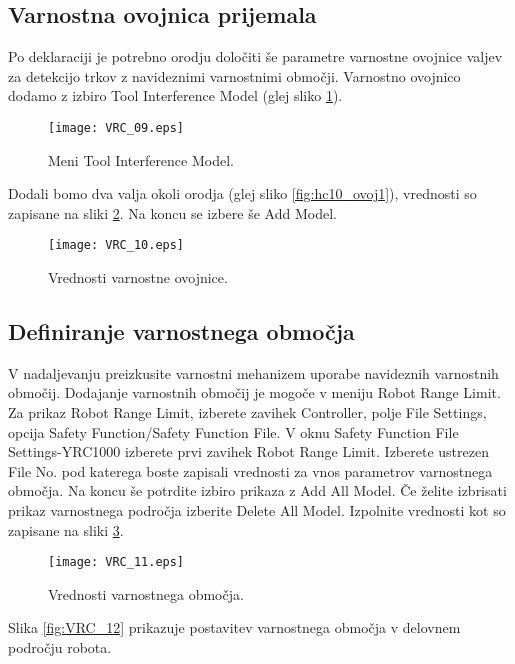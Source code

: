 \subsection*{Varnostna ovojnica prijemala}

Po deklaraciji je potrebno orodju določiti še parametre varnostne ovojnice valjev za detekcijo trkov z navideznimi varnostnimi območji. Varnostno ovojnico dodamo z izbiro Tool Interference Model (glej sliko \ref{fig:VRC_09}).

\begin{figure}[hbt]
	\centering
	\texttt{[image: VRC\_09.eps]}
	\caption{Meni Tool Interference Model.}
	\label{fig:VRC_09}
\end{figure}

Dodali bomo dva valja okoli orodja (glej sliko \ref{fig:hc10_ovoj1}), vrednosti so zapisane na sliki \ref{fig:VRC_10}. Na koncu se izbere še Add Model.

\begin{figure}[hbt]
	\centering
	\texttt{[image: VRC\_10.eps]}
	\caption{Vrednosti varnostne ovojnice.}
	\label{fig:VRC_10}
\end{figure}

\subsection*{Definiranje varnostnega območja}

V nadaljevanju preizkusite varnostni mehanizem uporabe navideznih varnostnih območij. Dodajanje varnostnih območij je mogoče v meniju Robot Range Limit. Za prikaz Robot Range Limit, izberete zavihek Controller, polje File Settings, opcija Safety Function/Safety Function File. V oknu Safety Function File Settings-YRC1000 izberete prvi zavihek Robot Range Limit. Izberete ustrezen File No. pod katerega boste zapisali vrednosti za vnos parametrov varnostnega območja. Na koncu še potrdite izbiro prikaza z Add All Model. Če želite izbrisati prikaz varnostnega področja izberite Delete All Model. Izpolnite vrednosti kot so zapisane na sliki \ref{fig:VRC_11}.

\begin{figure}[hbt]
	\centering
	\texttt{[image: VRC\_11.eps]}
	\caption{Vrednosti varnostnega območja.}
	\label{fig:VRC_11}
\end{figure}

Slika \ref{fig:VRC_12} prikazuje postavitev varnostnega območja v delovnem področju robota.

